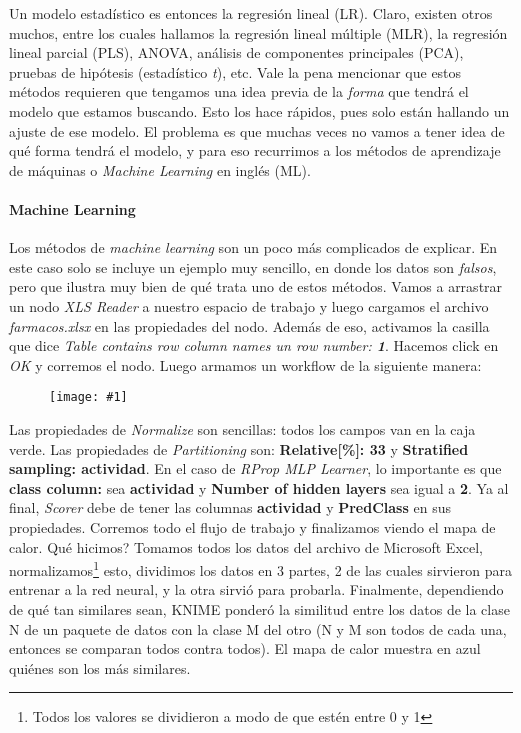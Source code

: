 \documentclass[10pt,letterpaper]{article}
\newcommand{\Picture}[1]
{
	\begin{figure}[H]
	\begin{flushleft}
	\texttt{[image: \#1]}
	\end{flushleft}
	\end{figure}
}
\begin{document}
Un modelo estad\'istico es entonces la regresi\'on lineal (LR). Claro, existen otros muchos, entre los cuales hallamos la regresi\'on lineal m\'ultiple (MLR), la regresi\'on lineal parcial (PLS), ANOVA, an\'alisis de componentes principales (PCA), pruebas de hip\'otesis (estad\'istico \emph{t}), etc. Vale la pena mencionar que estos m\'etodos requieren que tengamos una idea previa de la \textit{forma} que tendr\'a el modelo que estamos buscando. Esto los hace r\'apidos, pues solo est\'an hallando un ajuste de ese modelo. El problema es que muchas veces no vamos a tener idea de qu\'e forma tendr\'a el modelo, y para eso recurrimos a los m\'etodos de aprendizaje de m\'aquinas o \emph{Machine Learning} en ingl\'es (ML).

\paragraph{Machine Learning}
Los m\'etodos de \emph{machine learning} son un poco m\'as complicados de explicar. En este caso solo se incluye un ejemplo muy sencillo, en donde los datos son \emph{falsos}, pero que ilustra muy bien de qu\'e trata uno de estos m\'etodos. Vamos a arrastrar un nodo \textit{XLS Reader} a nuestro espacio de trabajo y luego cargamos el archivo \textit{farmacos.xlsx} en las propiedades del nodo. Adem\'as de eso, activamos la casilla que dice \textit{Table contains row column names un row number: \textbf{1}}. Hacemos click en \textit{OK} y corremos el nodo. Luego armamos un workflow de la siguiente manera:

\Picture{img/workflow.png}

Las propiedades de \textit{Normalize} son sencillas: todos los campos van en la caja verde. Las propiedades de \textit{Partitioning} son: \textbf{Relative[\%]: 33} y \textbf{Stratified sampling: actividad}. En el caso de \textit{RProp MLP Learner}, lo importante es que \textbf{class column:} sea \textbf{actividad} y \textbf{Number of hidden layers} sea igual a \textbf{2}. Ya al final, \textit{Scorer} debe de tener las columnas \textbf{actividad} y \textbf{PredClass} en sus propiedades. Corremos todo el flujo de trabajo y finalizamos viendo el mapa de calor. Qu\'e hicimos? Tomamos todos los datos del archivo de Microsoft Excel, normalizamos\footnote{Todos los valores se dividieron a modo de que est\'en entre 0 y 1} esto, dividimos los datos en 3 partes, 2 de las cuales sirvieron para entrenar a la red neural, y la otra sirvi\'o para probarla. Finalmente, dependiendo de qu\'e tan similares sean, KNIME ponder\'o la similitud entre los datos de la clase N de un paquete de datos con la clase M del otro (N y M son todos de cada una, entonces se comparan todos contra todos). El mapa de calor muestra en azul qui\'enes son los m\'as similares.
\end{document}
